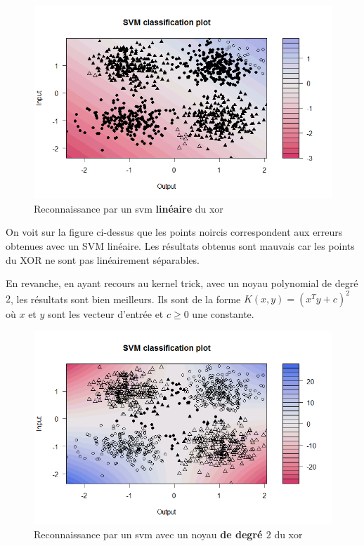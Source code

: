 \documentclass{article}
\begin{document}
\begin{figure}[!h]\centering
\includegraphics[scale=0.6]{svmlinxor.png}
\caption{Reconnaissance par un svm \textbf{linéaire} du xor}
\label{fig:svmlinxor}
\end{figure}

\noindent On voit sur la figure ci-dessus que les points noircis correspondent aux erreurs obtenues avec un SVM linéaire. Les résultats obtenus sont mauvais car les points du XOR ne sont pas linéairement séparables.

\newpage

\noindent En revanche, en ayant recours au kernel trick, avec un noyau polynomial de degré $2$, les résultats sont bien meilleurs. Ils sont de la forme $K(x,y)=(x^T y+c)^2$ où $x$ et $y$ sont les vecteur d'entrée et $c\geq 0$ une constante.

\begin{figure}[!h]\centering
\includegraphics[scale=0.6]{svmxorplydot.png}
\caption{Reconnaissance par un svm  avec un noyau \textbf{de degré $2$} du xor}
\label{fig:svmpolydot}
\end{figure}
\end{document}
